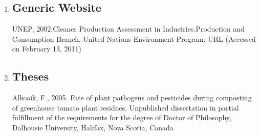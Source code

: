 \documentclass[fleqn,10pt]{thescipub} %
\begin{document}
\begin{enumerate}
\item \subsection{Generic Website}
UNEP, 2002.Cleaner Production Assessment in Industries.Production and Consumption Branch. United Nations Environment Program. {URL} (Accessed on February 13, 2011)
\item \subsection{Theses}
Alkoaik, F., 2005. Fate of plant pathogens and pesticides during composting of greenhouse tomato plant residues. Unpublished dissertation in partial fulfillment of the requirements for the degree of Doctor of Philosophy, Dalhousie University, Halifax, Nova Scotia, Canada
\end{enumerate}

\setlength{\bibsep}{0.5pt} %
 

\end{document}

